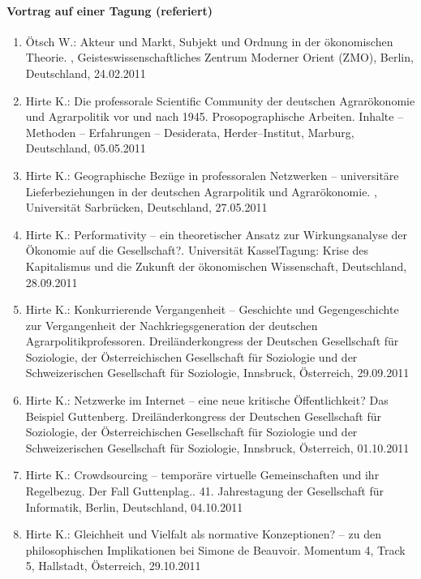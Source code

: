 \paragraph{Vortrag auf einer Tagung (referiert)}
\begin{enumerate}
	\item Ötsch W.: Akteur und Markt, Subjekt und Ordnung in der ökonomischen Theorie. , Geisteswissenschaftliches Zentrum Moderner Orient (ZMO), Berlin, Deutschland, 24.02.2011
	\item Hirte K.: Die professorale Scientific Community der deutschen Agrarökonomie und Agrarpolitik vor und nach 1945. Prosopographische Arbeiten. Inhalte -- Methoden -- Erfahrungen -- Desiderata, Herder--Institut, Marburg, Deutschland, 05.05.2011
	\item Hirte K.: Geographische Bezüge in professoralen Netzwerken -- universitäre Lieferbeziehungen in der deutschen Agrarpolitik und Agrarökonomie. , Universität Sarbrücken, Deutschland, 27.05.2011
	\item Hirte K.: Performativity -- ein theoretischer Ansatz zur Wirkungsanalyse der Ökonomie auf die Gesellschaft?. Universität KasselTagung: Krise des Kapitalismus und die Zukunft der ökonomischen Wissenschaft, Deutschland, 28.09.2011
	\item Hirte K.: Konkurrierende Vergangenheit -- Geschichte und Gegengeschichte zur Vergangenheit der Nachkriegsgeneration der deutschen Agrarpolitikprofessoren. Dreiländerkongress der Deutschen Gesellschaft für Soziologie, der Österreichischen Gesellschaft für Soziologie und der Schweizerischen Gesellschaft für Soziologie, Innsbruck, Österreich, 29.09.2011
	\item Hirte K.: Netzwerke im Internet -- eine neue kritische Öffentlichkeit? Das Beispiel Guttenberg. Dreiländerkongress der Deutschen Gesellschaft für Soziologie, der Österreichischen Gesellschaft für Soziologie und der Schweizerischen Gesellschaft für Soziologie, Innsbruck, Österreich, 01.10.2011
	\item Hirte K.: Crowdsourcing -- temporäre virtuelle Gemeinschaften und ihr Regelbezug. Der Fall Guttenplag.. 41. Jahrestagung der Gesellschaft für Informatik, Berlin, Deutschland, 04.10.2011
	\item Hirte K.: Gleichheit und Vielfalt als normative Konzeptionen? -- zu den philosophischen Implikationen bei Simone de Beauvoir. Momentum 4, Track 5, Hallstadt, Österreich, 29.10.2011
\end{enumerate}
